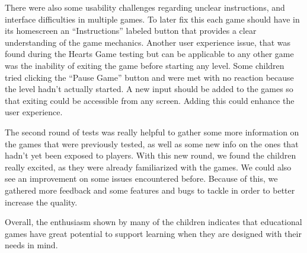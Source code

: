 
There were also some usability challenges regarding unclear instructions, and interface difficulties in multiple games. To later fix this each game should have in its homescreen an ``Instructions'' labeled button that provides a clear understanding of the game mechanics. Another user experience issue, that was found during the Hearts Game testing but can be applicable to any other game was the inability of exiting the game before starting any level. Some children tried clicking the ``Pause Game'' button and were met with no reaction because the level hadn't actually started. A new input should be added to the games so that exiting could be accessible from any screen. Adding this could enhance the user experience.

The second round of tests was really helpful to gather some more information on the games that were previously tested, as well as some new info on the ones that hadn't yet been exposed to players. With this new round, we found the children really excited, as they were already familiarized with the games. We could also see an improvement on some issues encountered before. Because of this, we gathered more feedback and some features and bugs to tackle in order to better increase the quality.

Overall, the enthusiasm shown by many of the children indicates that educational games have great potential to support learning when they are designed with their needs in mind.



